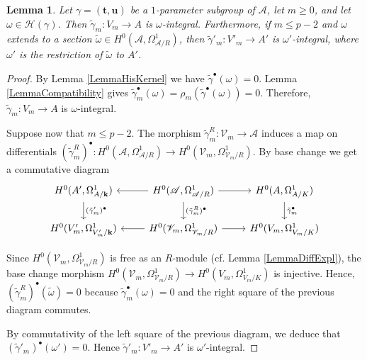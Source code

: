 \documentclass[11pt]{amsart}
\newtheorem{lemma}[theorem]{Lemma}
\theoremstyle{remark}
\numberwithin{equation}{section}
\newcommand{\Acal}{\mathscr{A}}
\newcommand{\Hcal}{\mathscr{H}}
\newcommand{\Vcal}{\mathscr{V}}
\newcommand{\kk}{\mathbf{k}}
\newcommand{\ttt}{\mathbf{t}}
\newcommand{\uu}{\mathbf{u}}
\begin{document}
\begin{lemma}\label{Lemmawintgamma} Let $\gamma=(\ttt,\uu)$ be a $1$-parameter subgroup of $\Acal$, let $m\ge 0$, and let $\omega \in \Hcal(\gamma)$. Then $\tilde{\gamma}_m:V_m\to A$ is $\omega$-integral. Furthermore, if $m\le p-2$ and $\omega$ extends to a section $\widetilde{\omega}\in H^0(\Acal,\Omega^1_{\Acal/R})$, then $\tilde{\gamma}'_m:V'_m\to A'$ is $\omega'$-integral, where $\omega'$ is the restriction of $\widetilde{\omega}$ to $A'$. 
\end{lemma}
\begin{proof} By Lemma \ref{LemmaHisKernel} we have $\tilde{\gamma}^\bullet (\omega)=0$. Lemma \ref{LemmaCompatibility} gives $\tilde{\gamma}^\bullet_m(\omega)=\rho_m(\tilde{\gamma}^\bullet (\omega))=0$. Therefore, $\tilde{\gamma}_m:V_m\to A$ is $\omega$-integral.

Suppose now that $m\le p-2$. The morphism $\tilde{\gamma}^R_m:\Vcal_m\to \Acal$ induces a map on differentials $(\tilde{\gamma}^R_m)^\bullet : H^0(\Acal,\Omega^1_{\Acal/R})\to H^0(\Vcal_m,\Omega^1_{\Vcal_m/R})$. By base change we get a commutative diagram
$$
\begin{tikzcd}
H^0(A',\Omega^1_{A/\kk})  \arrow{d}{(\tilde{\gamma}'_m)^\bullet} &    H^0(\Acal,\Omega^1_{\Acal/R}) \arrow{l} \arrow{r} \arrow{d}{(\tilde{\gamma}^R_m)^\bullet} &   H^0(A,\Omega^1_{A/K}) \arrow{d}{\tilde{\gamma}_m^\bullet} \\
H^0(V'_m,\Omega^1_{V'_m/\kk})   &   H^0(\Vcal_m,\Omega^1_{\Vcal_m/R}) \arrow{l} \arrow{r}& H^0(V_m,\Omega^1_{V_m/K})
\end{tikzcd}
$$

Since $H^0(\Vcal_m,\Omega^1_{\Vcal_m/R})$ is free as an $R$-module (cf. Lemma \ref{LemmaDiffExpl}), the base change morphism $H^0(\Vcal_m,\Omega^1_{\Vcal_m/R}) \to H^0(V_m,\Omega^1_{V_m/K})$  is injective. Hence, $(\tilde{\gamma}^R_m)^\bullet(\widetilde{\omega})=0$ because $\tilde{\gamma}^\bullet_m(\omega)=0$ and the right square of the previous diagram commutes.

By commutativity of the left square of the previous diagram, we deduce that $(\tilde{\gamma}'_m)^\bullet(\omega')=0$. Hence $\tilde{\gamma}'_m:V'_m\to A'$ is $\omega'$-integral.
\end{proof}





\end{document}
